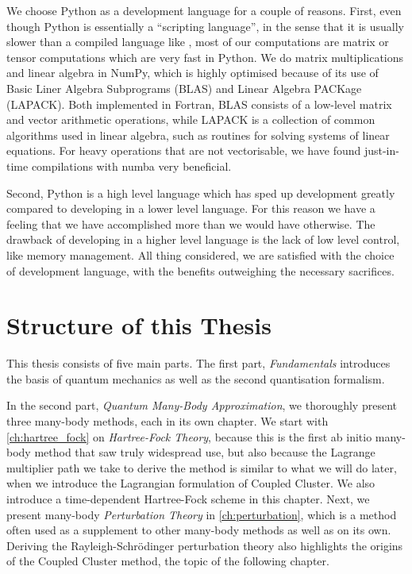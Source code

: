     We choose Python as a development language for a couple of reasons. 
    First, even though Python is essentially a  ``scripting language'', in the sense 
    that it is usually slower than a compiled language like \CC,
    most of our computations are matrix or tensor computations which are very fast
    in Python. We do matrix multiplications and linear algebra in NumPy, which 
    is highly optimised because of its use of Basic Liner Algebra Subprograms (BLAS) 
    and Linear Algebra PACKage (LAPACK).
    Both implemented in Fortran, BLAS consists of a low-level matrix and vector 
    arithmetic operations, while LAPACK is a collection of common algorithms 
    used in linear algebra, such as routines for solving systems of linear 
    equations. For heavy operations that are not vectorisable, we have found
    just-in-time compilations with numba very beneficial.

    Second, Python is a high level language which has sped up development greatly 
    compared to developing in a lower level language. For this reason we 
    have a feeling that we have accomplished more than we would have 
    otherwise. The drawback of developing in a higher level language is the 
    lack of low level control, like memory management. All thing considered,
    we are satisfied with the choice of development language, with the benefits 
    outweighing the necessary sacrifices.

\section{Structure of this Thesis}

    This thesis consists of five main parts. The first part, \emph{Fundamentals} 
    introduces the basis of quantum mechanics as well as the second quantisation 
    formalism.
    
    In the second part, \emph{Quantum Many-Body Approximation}, we 
    thoroughly present three many-body methods, each in its own chapter.
    We start with \autoref{ch:hartree_fock} on \emph{Hartree-Fock Theory},
    because this is 
    the first ab initio many-body method that saw truly widespread use, but 
    also because the Lagrange multiplier path we take to derive the method is 
    similar to what we will do later, when we introduce the Lagrangian formulation 
    of Coupled Cluster.
    We also introduce a time-dependent Hartree-Fock scheme in this chapter.
    Next, we present many-body \emph{Perturbation Theory} in \autoref{ch:perturbation},
    which is a method often used as
    a supplement to other many-body methods as well as on its own. Deriving 
    the Rayleigh-Schrödinger perturbation theory also highlights the origins 
    of the Coupled Cluster method, the topic of the following chapter.
    
